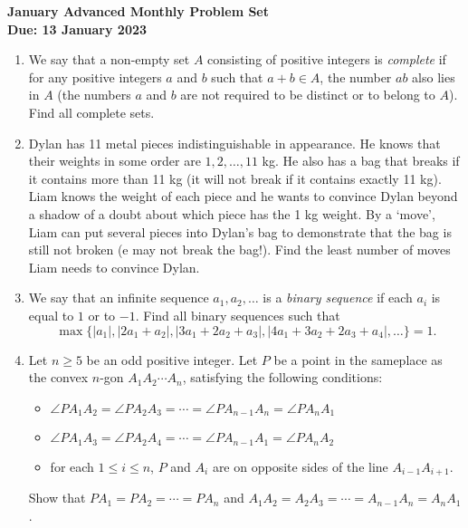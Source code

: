 \documentclass{article}
\newcommand{\abs}[1]{\left|#1\right|}
\begin{document}
\thispagestyle{empty}

\begin{center}
  \textbf{\Large January Advanced Monthly Problem Set}
  \\ \vspace{1em}
  \textbf{\large Due: 13 January 2023}
\end{center}

\bigskip \bigskip

\begin{enumerate}[itemsep=\fill]

 
\item %
We say that a non-empty set $A$ consisting of positive integers is \textit{complete} if for any positive integers $a$ and $b$ such that $a+b\in A$, the number $ab$ also lies in $A$ (the numbers $a$ and $b$ are not required to be distinct or to belong to $A$). Find all complete sets.


\item %
Dylan has 11 metal pieces indistinguishable in appearance.
He knows that their weights in some order are $1,2,\dotsc,11$ kg.
He also has a bag that breaks if it contains more than 11 kg (it will not break if it contains exactly 11 kg).
Liam knows the weight of each piece and he wants to convince Dylan beyond a shadow of a doubt about which piece has the 1 kg weight.
By a `move', Liam can put several pieces into Dylan's bag to demonstrate that the bag is still not broken (e may not break the bag!).
Find the least number of moves Liam needs to convince Dylan.


\item %
We say that an infinite sequence $a_1, a_2, \dotsc$ is a \emph{binary sequence} if each $a_i$ is equal to $1$ or to $-1$.
Find all binary sequences such that \[ \max\{\abs{a_1}, \abs{2a_1+a_2}, \abs{3a_1+2a_2+a_3}, \abs{4a_1+3a_2+2a_3+a_4}, \dotsc\} = 1. \]


\item %
Let $n \geq 5$ be an odd positive integer.
Let $P$ be a point in the sameplace as the convex $n$-gon $A_1 A_2 \dotsm A_n$, satisfying the following conditions:
\begin{itemize}
	\item $\angle PA_1A_2 = \angle PA_2A_3 = \dotsb = \angle PA_{n-1}A_n = \angle PA_nA_1$
  \item $\angle PA_1A_3 =\angle PA_2A_4 = \dotsb = \angle PA_{n-1}A_1 = \angle PA_nA_2$
  \item for each $1\leq i\leq n$, $P$ and $A_i$ are on opposite sides of the line $A_{i-1}A_{i+1}$.
\end{itemize}
Show that $PA_1 = PA_2 = \dotsb = PA_n$ and $A_1A_2 = A_2A_3 = \dotsb = A_{n-1}A_n = A_nA_1$.



\end{enumerate}
\end{document}
